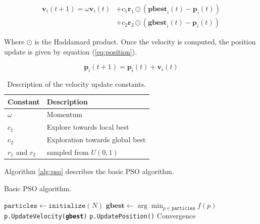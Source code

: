 \begin{align}
  \textbf{v}_i(t+1) = \omega \textbf{v}_i (t) & +
                                                c_1 \textbf{r}_1\odot (\textbf{pbest}_i(t) -
                                                \textbf{p}_i(t))
  \\\label{eq:velocity}
  &+ c_2 \textbf{r}_2 \odot(\textbf{gbest}_i(t) - \textbf{p}_i(t))\nonumber
\end{align}

Where $\odot$ is the Haddamard product.
Once the velocity is computed, the position update is given by equation
(\ref{eq:position}).

\begin{equation}\label{eq:position}
  \textbf{p}_i(t+1) = \textbf{p}_i(t) + \textbf{v}_i(t)
\end{equation}

\begin{table}
  \caption{Description of the velocity update constants.}\label{tab:constants}
  \begin{tabular}{ll}\toprule
  \textbf{Constant} & \textbf{Description}\\\midrule
  $\omega$ & Momentum\\
  $c_1$ & Explore towards local best\\
  $c_2$ & Exploration towards global best\\
  $r_1$ and $r_2$ & sampled from $U(0,1)$\\\bottomrule
  \end{tabular}
\end{table}

Algorithm \ref{alg:pso} describes the basic PSO algorithm.

\begin{algorithm}
  \caption{Basic PSO algorithm.}\label{alg:pso}
  \begin{algorithmic}[1]
    \State $\texttt{particles} \gets \texttt{initialize}(N)$
    \Repeat
    \State $\textbf{gbest} \gets \arg\min_{p\in\texttt{particles}}f(p)$
    \State \texttt{p.UpdateVelocity(\textbf{gbest})}
    \State \texttt{p.UpdatePosition()}
    \EndFor
    \Until Convergence
    \EndProcedure
  \end{algorithmic}
\end{algorithm}

